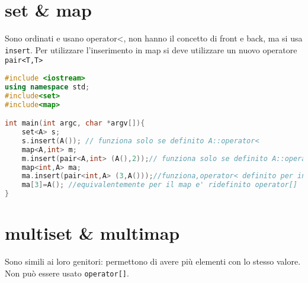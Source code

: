 \section{set \& map}
Sono ordinati e usano operator<, non hanno il concetto di front e back, ma si usa \verb|insert|. Per utilizzare l'inserimento in map si deve utilizzare un nuovo operatore \verb|pair<T,T>|

\begin{lstlisting}[language=c++]
#include <iostream>
using namespace std;
#include<set>
#include<map>

int main(int argc, char *argv[]){
    set<A> s;
    s.insert(A()); // funziona solo se definito A::operator<
    map<A,int> m;
    m.insert(pair<A,int> (A(),2));// funziona solo se definito A::operator<
    map<int,A> ma;
    ma.insert(pair<int,A> (3,A()));//funziona,operator< definito per int
    ma[3]=A(); //equivalentemente per il map e' ridefinito operator[]            
}    
\end{lstlisting}


\section{multiset \& multimap}
Sono simili ai loro genitori: permettono di avere più elementi con lo stesso valore. Non può essere usato \verb|operator[]|.